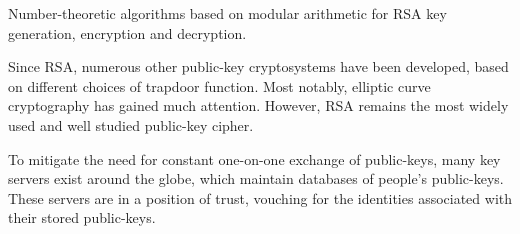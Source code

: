 \begin{table}[htpb]
\caption{Number-theoretic algorithms based on modular arithmetic for RSA key generation, encryption and decryption.} \label{alg:RSA}
\end{table}

Since RSA, numerous other public-key cryptosystems have been developed, based on different choices of trapdoor function. Most notably, elliptic curve cryptography has gained much attention. However, RSA remains the most widely used and well studied public-key cipher.

To mitigate the need for constant one-on-one exchange of public-keys, many key servers exist around the globe, which maintain databases of people's public-keys. These servers are in a position of trust, vouching for the identities associated with their stored public-keys.

